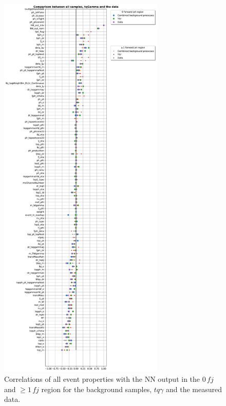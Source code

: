 \begin{figure}
    \centering
    \includegraphics[width=0.7\textwidth]{Plots/corrAll.pdf}
    \caption{Correlations of all event properties with the NN output in the $0\,fj$ and $\geq 1\,fj$ region for the background samples, $tq\gamma$ and the measured data.}
    \label{fig:corrAll}
\end{figure}